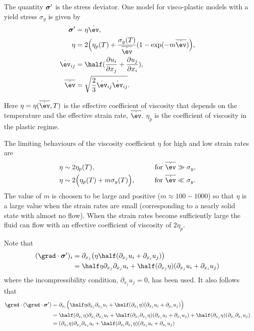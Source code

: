 \documentclass[12pt]{article}
\begin{document}
\newcommand{\esr}{\overline{ {\dot \ev} }}

The quantity $\boldsymbol{\sigma}'$ is the stress deviator. One model for visco-plastic models with
a yield stress $\sigma_y$ is given by
\begin{align*}
   \sigmav' &= \eta {\dot \ev}, \\
   \eta &= 2\Big( \eta_p(T) + {\sigma_y(T) \over \esr }( 1 - \exp(-m\esr) \Big), \\
    {\dot \ev}_{ij} &= \half( {\partial u_i\over\partial x_j} + {\partial u_j\over\partial x_i}), \\
    \esr &= \sqrt{ {2\over 3} {\dot \ev}_{ij}{\dot \ev}_{ij} } . 
\end{align*}


Here $\eta=\eta(\esr,T)$ is the effective coefficient of viscosity that depends on
the temperature and the effective strain rate, $\esr$. $\eta_p$ is the coefficient
of viscosity in the plastic regime. 


The limiting behaviours of the viscosity coefficient $\eta$ for high and low strain rates are
\begin{alignat*}{3}
\eta &\sim 2 \eta_p(T), &\qquad& \text{for $\esr \gg \sigma_y$}, \\
\eta &\sim 2\Big( \eta_p(T) + m \sigma_y(T) \Big), &\qquad& \text{for $\esr \ll \sigma_y$} . 
\end{alignat*}
The value of $m$ is choosen to be large and positive ($m \approx 100-1000$) so that
$\eta$ is a large value when the strain rates are small (corresponding to a nearly solid state
with almost no flow).
When the strain rates become sufficiently large the fluid can flow with an effective
coefficient of viscosity of $2\eta_p$. 

Note that 
\begin{align*}
  (\grad\cdot \sigmav')_{i} &= 
     \partial_{x_j} \big( \eta \half( \partial_{x_j} u_i + \partial_{x_i} u_j ) \big) \\
          &= \half\eta \partial_{x_j}\partial_{x_j} u_i + 
                 \half (\partial_{x_j}\eta)(\partial_{x_j} u_i + \partial_{x_i} u_j )
\end{align*}
where the incompressibility condition, $\partial_{x_j} u_j = 0$, has been used.
It also follows that
\begin{align*}
\grad\cdot(\grad\cdot \sigmav') &= 
    \partial_{x_i}\Big( \half\eta \partial_{x_j}\partial_{x_j} u_i + 
                 \half (\partial_{x_j}\eta)(\partial_{x_j} u_i + \partial_{x_i} u_j ) \Big) \\
   &= \half(\partial_{x_i}\eta)\partial_{x_j}\partial_{x_j} u_i +
        \half (\partial_{x_i}\partial_{x_j}\eta)(\partial_{x_j} u_i + \partial_{x_i} u_j )  +
        \half (\partial_{x_j}\eta)(\partial_{x_i}\partial_{x_i} u_j ) \\ 
   &= (\partial_{x_i}\eta)\partial_{x_j}\partial_{x_j} u_i +
        \half (\partial_{x_i}\partial_{x_j}\eta)(\partial_{x_j} u_i + \partial_{x_i} u_j )
\end{align*}
\end{document}
